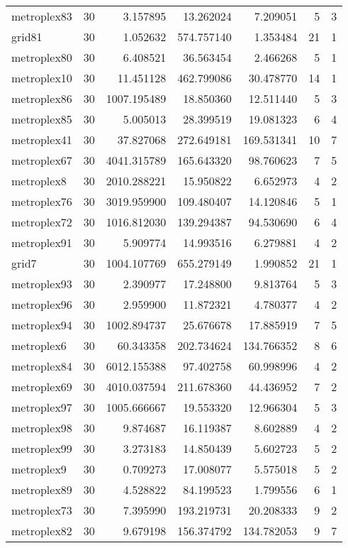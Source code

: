 \documentclass[../../../thesis.tex]{subfiles}
\begin{document}
\begin{longtable}{|l|r|r|r|r|r|r|}
metroplex83 & 30 & 3.157895 & 13.262024 & 7.209051 & 5 & 3 \\
grid81 & 30 & 1.052632 & 574.757140 & 1.353484 & 21 & 1 \\
metroplex80 & 30 & 6.408521 & 36.563454 & 2.466268 & 5 & 1 \\
metroplex10 & 30 & 11.451128 & 462.799086 & 30.478770 & 14 & 1 \\
metroplex86 & 30 & 1007.195489 & 18.850360 & 12.511440 & 5 & 3 \\
metroplex85 & 30 & 5.005013 & 28.399519 & 19.081323 & 6 & 4 \\
metroplex41 & 30 & 37.827068 & 272.649181 & 169.531341 & 10 & 7 \\
metroplex67 & 30 & 4041.315789 & 165.643320 & 98.760623 & 7 & 5 \\
metroplex8 & 30 & 2010.288221 & 15.950822 & 6.652973 & 4 & 2 \\
metroplex76 & 30 & 3019.959900 & 109.480407 & 14.120846 & 5 & 1 \\
metroplex72 & 30 & 1016.812030 & 139.294387 & 94.530690 & 6 & 4 \\
metroplex91 & 30 & 5.909774 & 14.993516 & 6.279881 & 4 & 2 \\
grid7 & 30 & 1004.107769 & 655.279149 & 1.990852 & 21 & 1 \\
metroplex93 & 30 & 2.390977 & 17.248800 & 9.813764 & 5 & 3 \\
metroplex96 & 30 & 2.959900 & 11.872321 & 4.780377 & 4 & 2 \\
metroplex94 & 30 & 1002.894737 & 25.676678 & 17.885919 & 7 & 5 \\
metroplex6 & 30 & 60.343358 & 202.734624 & 134.766352 & 8 & 6 \\
metroplex84 & 30 & 6012.155388 & 97.402758 & 60.998996 & 4 & 2 \\
metroplex69 & 30 & 4010.037594 & 211.678360 & 44.436952 & 7 & 2 \\
metroplex97 & 30 & 1005.666667 & 19.553320 & 12.966304 & 5 & 3 \\
metroplex98 & 30 & 9.874687 & 16.119387 & 8.602889 & 4 & 2 \\
metroplex99 & 30 & 3.273183 & 14.850439 & 5.602723 & 5 & 2 \\
metroplex9 & 30 & 0.709273 & 17.008077 & 5.575018 & 5 & 2 \\
metroplex89 & 30 & 4.528822 & 84.199523 & 1.799556 & 6 & 1 \\
metroplex73 & 30 & 7.395990 & 193.219731 & 20.208333 & 9 & 2 \\
metroplex82 & 30 & 9.679198 & 156.374792 & 134.782053 & 9 & 7 \\

\end{longtable}
\end{document}
